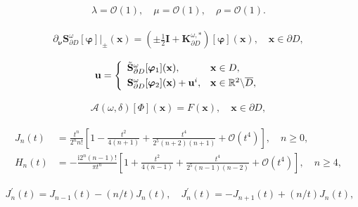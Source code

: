 \documentclass[10pt,a4paper]{amsart}
\newcommand{\Acal}{\mathcal{A}}
\newcommand{\bI}{\mathbf{I}}
\newcommand{\bK}{\mathbf{K}}
\newcommand{\bS}{\mathbf{S}}
\newcommand{\bnu}{\bm{\nu}}
\newcommand{\bu}{\mathbf{u}}
\newcommand{\bvarphi}{\bm{\varphi}}
\newcommand{\bx}{\mathbf{x}}
\newcommand{\td}{\tilde}
\begin{document}
\begin{align}\label{eq:lambda=}
	\lambda=\mathcal{O}(1),\quad\mu=\mathcal{O}(1),\quad\rho=\mathcal{O}(1).
\end{align}    

\begin{align}\label{eq:jump}
	\partial_{\bnu}   \bS_{\partial D}^{\omega}[\bvarphi]|_{\pm}(\bx)=\left( \pm\frac{1}{2}\bI +  \bK_{\partial D}^{\omega, *} \right)[\bvarphi](\bx), \quad \bx\in\partial D,
\end{align}

\begin{align}\label{eq:sol}
	\bu=
	\left\{
	\begin{array}{ll}
		\td{\bS}_{\partial D}^{\omega}[\bvarphi_{1}](\bx), & \bx\in D,  \smallskip \\
		{\bS}_{\partial D}^{\omega}[\bvarphi_{2}](\bx) +\bu^i, &  \bx\in \mathbb{R}^2\backslash \overline{D},
	\end{array}
	\right.
\end{align}

\begin{align}\label{eq:or}
	\Acal(\omega,\delta) [\Phi](\bx)=F(\bx), \quad \bx\in\partial D,
\end{align}

\begin{align}
	J_{n}(t) &=\frac{t^{n} }{2^{n}n! } \left [ 1-\frac{t^{2} }{4(n+1)}  +\frac{t^{4} }{2^{5}(n+2)(n+1) } + \mathcal{O}(t^4)\right ], \quad n\ge 0,\label{eq:jn}\\
	H_{n}(t)&=-\frac{\mathrm{i}2^{n} (n-1)!}{\pi t^{n} } \left [ 1+\frac{t^{2} }{4(n-1)} +\frac{t^{4} }{2^{5}(n-1)(n-2)}+\mathcal{O}(t^4)  \right ], \quad n\ge 4,\label{eq:hn}
\end{align}

\begin{align}
	J_{n}^{\prime}(t)=J_{n-1}(t)-(n/t)J_{n}(t),\quad
	J_{n}^{\prime}(t)=-J_{n+1}(t)+(n/t)J_{n}(t),\label{eq:dtgx}
\end{align}
\end{document}
